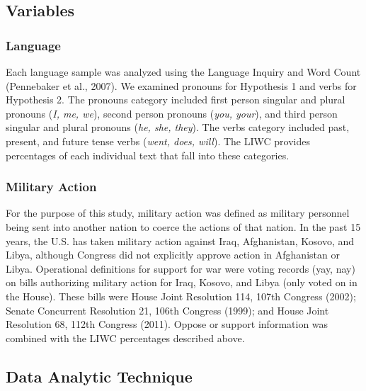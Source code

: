 \documentclass[english,,man]{apa6}
\theoremstyle{definition}
\theoremstyle{definition}
\theoremstyle{definition}
\theoremstyle{remark}
\begin{document}
\hypertarget{variables}{%
\subsection{Variables}\label{variables}}

\hypertarget{language}{%
\subsubsection{Language}\label{language}}

Each language sample was analyzed using the Language Inquiry and Word
Count (Pennebaker et al., 2007). We examined pronouns for Hypothesis 1
and verbs for Hypothesis 2. The pronouns category included first person
singular and plural pronouns (\emph{I, me, we}), second person pronouns
(\emph{you, your}), and third person singular and plural pronouns
(\emph{he, she, they}). The verbs category included past, present, and
future tense verbs (\emph{went, does, will}). The LIWC provides
percentages of each individual text that fall into these categories.

\hypertarget{military-action}{%
\subsubsection{Military Action}\label{military-action}}

For the purpose of this study, military action was defined as military
personnel being sent into another nation to coerce the actions of that
nation. In the past 15 years, the U.S. has taken military action against
Iraq, Afghanistan, Kosovo, and Libya, although Congress did not
explicitly approve action in Afghanistan or Libya. Operational
definitions for support for war were voting records (yay, nay) on bills
authorizing military action for Iraq, Kosovo, and Libya (only voted on
in the House). These bills were House Joint Resolution 114, 107th
Congress (2002); Senate Concurrent Resolution 21, 106th Congress (1999);
and House Joint Resolution 68, 112th Congress (2011). Oppose or support
information was combined with the LIWC percentages described above.

\hypertarget{data-analytic-technique}{%
\subsection{Data Analytic Technique}\label{data-analytic-technique}}
\end{document}
